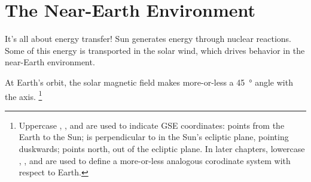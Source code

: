
\chapter{The Near-Earth Environment}
\label{ch_intro}






It's all about energy transfer! Sun generates energy through nuclear reactions. Some of this energy is transported in the solar wind, which drives behavior in the near-Earth environment. 


At Earth's orbit, the solar magnetic field makes more-or-less a \SI{45}{\degree} angle with the \X axis. 
\footnote{Uppercase \X, \Y, and \Z are used to indicate GSE coordinates: \X points from the Earth to the Sun; \Y is perpendicular to \X in the Sun's ecliptic plane, pointing duskwards; \Z points north, out of the ecliptic plane. In later chapters, lowercase \x, \y, and \z are used to define a more-or-less analogous corodinate system with respect to Earth. }


